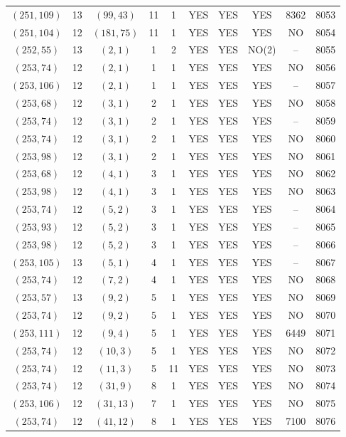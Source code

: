 \begin{longtable}{|c|c|c|c|c|c|c|c|c|c|}
$(251, 109)$ & 13 & $(99, 43)$ & 11 & 1 & YES & YES & YES & 8362 & 8053\\
$(251, 104)$ & 12 & $(181, 75)$ & 11 & 1 & YES & YES & YES & NO & 8054\\
$(252, 55)$ & 13 & $(2, 1)$ & 1 & 2 & YES & YES & NO(2) & -- & 8055\\
$(253, 74)$ & 12 & $(2, 1)$ & 1 & 1 & YES & YES & YES & NO & 8056\\
$(253, 106)$ & 12 & $(2, 1)$ & 1 & 1 & YES & YES & YES & -- & 8057\\
$(253, 68)$ & 12 & $(3, 1)$ & 2 & 1 & YES & YES & YES & NO & 8058\\
$(253, 74)$ & 12 & $(3, 1)$ & 2 & 1 & YES & YES & YES & -- & 8059\\
$(253, 74)$ & 12 & $(3, 1)$ & 2 & 1 & YES & YES & YES & NO & 8060\\
$(253, 98)$ & 12 & $(3, 1)$ & 2 & 1 & YES & YES & YES & NO & 8061\\
$(253, 68)$ & 12 & $(4, 1)$ & 3 & 1 & YES & YES & YES & NO & 8062\\
$(253, 98)$ & 12 & $(4, 1)$ & 3 & 1 & YES & YES & YES & NO & 8063\\
$(253, 74)$ & 12 & $(5, 2)$ & 3 & 1 & YES & YES & YES & -- & 8064\\
$(253, 93)$ & 12 & $(5, 2)$ & 3 & 1 & YES & YES & YES & -- & 8065\\
$(253, 98)$ & 12 & $(5, 2)$ & 3 & 1 & YES & YES & YES & -- & 8066\\
$(253, 105)$ & 13 & $(5, 1)$ & 4 & 1 & YES & YES & YES & -- & 8067\\
$(253, 74)$ & 12 & $(7, 2)$ & 4 & 1 & YES & YES & YES & NO & 8068\\
$(253, 57)$ & 13 & $(9, 2)$ & 5 & 1 & YES & YES & YES & NO & 8069\\
$(253, 74)$ & 12 & $(9, 2)$ & 5 & 1 & YES & YES & YES & NO & 8070\\
$(253, 111)$ & 12 & $(9, 4)$ & 5 & 1 & YES & YES & YES & 6449 & 8071\\
$(253, 74)$ & 12 & $(10, 3)$ & 5 & 1 & YES & YES & YES & NO & 8072\\
$(253, 74)$ & 12 & $(11, 3)$ & 5 & 11 & YES & YES & YES & NO & 8073\\
$(253, 74)$ & 12 & $(31, 9)$ & 8 & 1 & YES & YES & YES & NO & 8074\\
$(253, 106)$ & 12 & $(31, 13)$ & 7 & 1 & YES & YES & YES & NO & 8075\\
$(253, 74)$ & 12 & $(41, 12)$ & 8 & 1 & YES & YES & YES & 7100 & 8076\\

\end{longtable}
